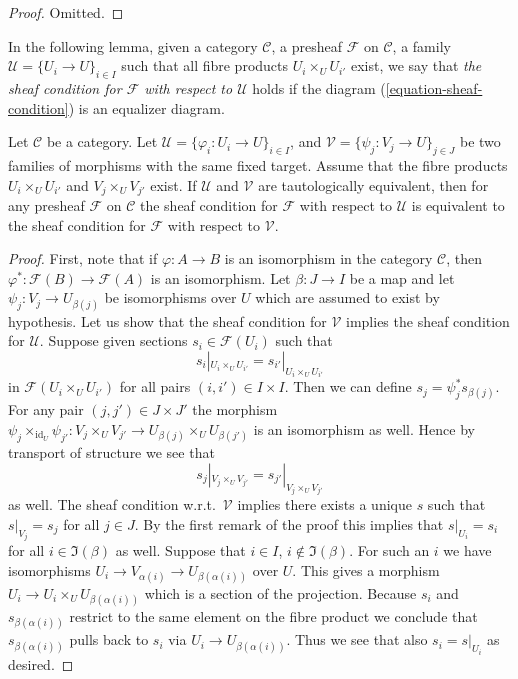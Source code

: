 \begin{proof}
Omitted.
\end{proof}

\noindent
In the following lemma, given a category $\mathcal{C}$, a presheaf
$\mathcal{F}$  on $\mathcal{C}$, a
family $\mathcal{U} = \{U_i \to U\}_{i\in I}$ such that
all fibre products $U_i \times_U U_{i'}$ exist, we say that
{\it the sheaf condition for $\mathcal{F}$ with respect to
$\mathcal{U}$} holds if the diagram (\ref{equation-sheaf-condition})
is an equalizer diagram.

\begin{lemma}
\label{lemma-tautological-same-sheaf}
Let $\mathcal{C}$ be a category. Let
$\mathcal{U} = \{\varphi_i : U_i \to U\}_{i\in I}$, and
$\mathcal{V} = \{\psi_j : V_j \to U\}_{j\in J}$ be two families of morphisms
with the same fixed target. Assume that the fibre products
$U_i \times_U U_{i'}$ and $V_j \times_U V_{j'}$ exist.
If $\mathcal{U}$ and $\mathcal{V}$ are
tautologically equivalent, then for any presheaf $\mathcal{F}$ on
$\mathcal{C}$ the sheaf condition for $\mathcal{F}$ with respect to
$\mathcal{U}$ is equivalent to the sheaf condition for $\mathcal{F}$
with respect to $\mathcal{V}$.
\end{lemma}

\begin{proof}
First, note that if $\varphi : A \to B$ is an isomorphism in the
category $\mathcal{C}$, then $\varphi^* : \mathcal{F}(B) \to \mathcal{F}(A)$
is an isomorphism. Let $\beta : J \to I$ be a map and let
$\psi_j : V_j \to U_{\beta(j)}$ be isomorphisms over $U$ which
are assumed to exist by hypothesis. Let us show that the sheaf
condition for $\mathcal{V}$ implies the sheaf condition for $\mathcal{U}$.
Suppose given sections $s_i \in \mathcal{F}(U_i)$ such that
$$
s_i|_{U_i \times_U U_{i'}} = s_{i'}|_{U_i \times_U U_{i'}}
$$
in $\mathcal{F}(U_i \times_U U_{i'})$ for all pairs $(i, i') \in I \times I$.
Then we can define $s_j = \psi_j^*s_{\beta(j)}$. For any pair
$(j, j') \in J \times J'$ the morphism
$\psi_j \times_{\text{id}_U} \psi_{j'} : V_j \times_U V_{j'} \to
U_{\beta(j)} \times_U U_{\beta(j')}$ is an isomorphism as well.
Hence by transport of structure we see that
$$
s_j|_{V_j \times_U V_{j'}} = s_{j'}|_{V_j \times_U V_{j'}}
$$
as well. The sheaf condition w.r.t.\ $\mathcal{V}$ implies there
exists a unique $s$ such that $s|_{V_j} = s_j$ for all $j \in J$.
By the first remark of the proof this implies that $s|_{U_i} = s_i$
for all $i \in \Im(\beta)$ as well. Suppose that $i \in I$,
$i \not \in \Im(\beta)$. For such an $i$ we have isomorphisms
$U_i \to V_{\alpha(i)} \to U_{\beta(\alpha(i))}$ over $U$. This gives a
morphism $U_i \to U_i \times_U U_{\beta(\alpha(i))}$ which is a
section of the projection. Because $s_i$ and $s_{\beta(\alpha(i))}$
restrict to the same element on the fibre product we conclude that
$s_{\beta(\alpha(i))}$ pulls back to $s_i$ via $U_i \to U_{\beta(\alpha(i))}$.
Thus we see that also $s_i = s|_{U_i}$ as desired.
\end{proof}

